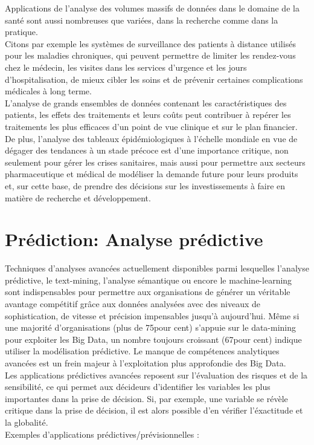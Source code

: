 \documentclass[11pt,twoside,openany,x11names,svgnames]{memoir}
\begin{document}
\begin{itemize}
			\normalsize Applications de l’analyse des volumes massifs de données dans le domaine de la santé sont aussi nombreuses que variées, dans la recherche comme dans la pratique. \\
Citons par exemple les systèmes de surveillance des patients à distance utilisés pour les maladies chroniques, qui peuvent permettre de limiter les rendez-vous chez le médecin, les visites dans les services d’urgence et les jours d’hospitalisation, de mieux cibler les soins et de prévenir certaines complications médicales à long terme.\\
L’analyse de grands ensembles de données contenant les caractéristiques des patients, les effets des traitements et leurs coûts peut contribuer à repérer les traitements les plus efficaces d’un point de vue clinique et sur le plan financier.  De plus, l’analyse des tableaux épidémiologiques à l’échelle mondiale en vue de dégager des tendances à un stade précoce est d’une importance critique, non seulement pour gérer les crises sanitaires, mais aussi pour permettre aux secteurs pharmaceutique et médical de modéliser la demande future pour leurs produits et, sur cette base, de prendre des décisions sur les investissements à faire en matière de recherche et développement.\\

		\section{Prédiction: Analyse prédictive}
		
		\normalsizeLes Techniques d’analyses avancées actuellement disponibles parmi lesquelles l’analyse prédictive, le text-mining, l’analyse sémantique ou encore le machine-learning sont indispensables pour permettre aux organisations de générer un véritable avantage compétitif grâce aux données analysées avec des niveaux de sophistication, de vitesse et précision impensables jusqu’à aujourd’hui. Même si une majorité d’organisations (plus de 75pour cent) s’appuie sur le data-mining pour exploiter les Big Data, un nombre toujours croissant (67pour cent) indique utiliser la modélisation prédictive. Le manque de compétences analytiques avancées est un frein majeur à l’exploitation plus approfondie des Big Data.\\
Les applications prédictives avancées reposent sur l’évaluation des risques et de la sensibilité, ce qui permet aux décideurs d’identifier les variables les plus importantes dans la prise de décision. Si, par  exemple, une variable se révèle critique dans la prise de décision, il est alors possible d’en vérifier  l’éxactitude et la globalité.\\
Exemples d’applications prédictives/prévisionnelles :



\end{itemize}
\end{document}
